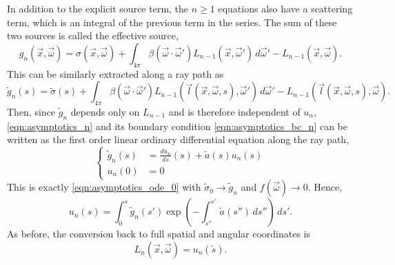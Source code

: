 In addition to the explicit source term, the  $n \geq 1$ equations also have a scattering term, which is an integral of the previous term in the series. The sum of these two sources is called the effective source,
\begin{equation*}
  g_n(\vec{x}, \vec{\omega}) = \sigma(\vec{x}, \vec{\omega}) + \int_{4\pi} \beta(\vec{\omega}\cdot\vec{\omega}')
  L_{n-1}(\vec{x}, \vec{\omega}')\,d\vec{\omega}' - L_{n-1}(\vec{x}, \vec{\omega}).
\end{equation*}
This can be similarly extracted along a ray path as
\begin{equation*}
  \tilde{g}_n(s) = \tilde{\sigma}(s) + \int_{4\pi} \beta(\vec{\omega}\cdot\vec{\omega}')
  L_{n-1}(\vec{l}(\vec{x}, \vec{\omega}, s), \vec{\omega}')\,d\vec{\omega}' - L_{n-1}(\vec{l}(\vec{x}, \vec{\omega}, s), \vec{\omega}).
\end{equation*}
Then, since $\tilde{g}_n$ depends only on $L_{n-1}$ and is therefore independent of $u_n$, \eqref{eqn:asymptotics_n} and its boundary condition \eqref{eqn:asymptotics_bc_n} can be written as the first order linear ordinary differential equation along the ray path,
\begin{equation}
  \left\{
  \begin{aligned}
    \tilde{g}_n(s) &= \frac{du_n}{ds}(s) + \tilde{a}(s)u_n(s) \\
    u_n(0) &= 0
  \end{aligned}
  \right.
  \label{eqn:asymptotics_ode_n}
\end{equation}
This is exactly \eqref{eqn:asymptotics_ode_0} with $\tilde{\sigma}_0 \to \tilde{g}_n$ and $f(\vec{\omega}) \to 0$.
Hence,
\begin{equation}
  u_n(s) = \int_0^s\tilde{g}_n(s')\exp\left( -\int_{s''}^{s'}\tilde{a}(s'')\,ds'' \right)\, ds'.
  \label{eqn:asymptotics_soln_n}
\end{equation}
As before, the conversion back to full spatial and angular coordinates is
\begin{equation*}
  L_n(\vec{x}, \vec{\omega}) = u_n(\tilde{s}).
\end{equation*}
